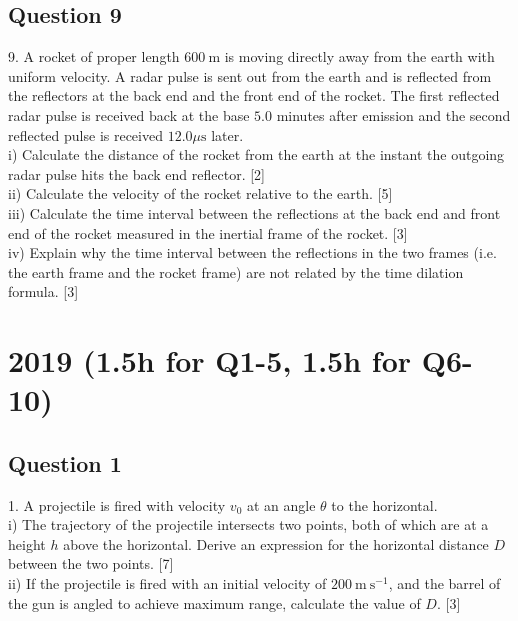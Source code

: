\documentclass{article}
\begin{document}
\subsection{Question 9}
9. A rocket of proper length $600 \mathrm{~m}$ is moving directly away from the earth with uniform velocity. A radar pulse is sent out from the earth and is reflected from the reflectors at the back end and the front end of the rocket. The first reflected radar pulse is received back at the base $5.0$ minutes after emission and the second reflected pulse is received $12.0 \mu \mathrm{s}$ later. \\
i) Calculate the distance of the rocket from the earth at the instant the outgoing radar pulse hits the back end reflector. [2] \\
ii) Calculate the velocity of the rocket relative to the earth. [5] \\
iii) Calculate the time interval between the reflections at the back end and front end of the rocket measured in the inertial frame of the rocket. [3] \\
iv) Explain why the time interval between the reflections in the two frames (i.e. the earth frame and the rocket frame) are not related by the time dilation formula. [3]



\section{2019 (1.5h for Q1-5, 1.5h for Q6-10)}
\subsection{Question 1}
1. A projectile is fired with velocity $v_{0}$ at an angle $\theta$ to the horizontal. \\
i) The trajectory of the projectile intersects two points, both of which are at a height $h$ above the horizontal. Derive an expression for the horizontal distance $D$ between the two points. [7]  \\
ii) If the projectile is fired with an initial velocity of $200 \mathrm{~m} \mathrm{~s}^{-1}$, and the barrel of the gun is angled to achieve maximum range, calculate the value of $D$. [3]
\end{document}
